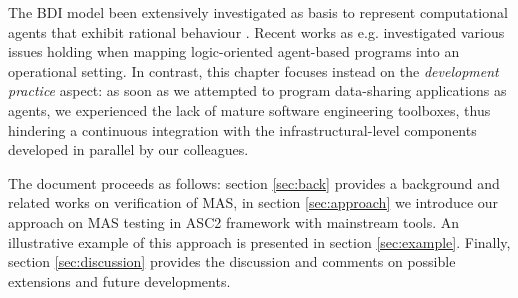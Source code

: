 The BDI model been extensively investigated as basis to represent computational agents that exhibit rational behaviour \cite{Herzig2017}.
Recent works as e.g. \cite{Kampik2020} investigated various issues holding when mapping logic-oriented agent-based programs into an operational setting. In contrast, this chapter focuses instead on the \textit{development practice} aspect: as soon as we attempted to program data-sharing applications as agents, we experienced the lack of  mature software engineering toolboxes, thus hindering a continuous integration with the infrastructural-level components developed in parallel by our colleagues.


The document proceeds as follows: section \ref{sec:back} provides a background and related works on verification of MAS, in section \ref{sec:approach} we introduce our approach on MAS testing in ASC2 framework with mainstream tools. An illustrative example of this approach is presented in section \ref{sec:example}. Finally, section \ref{sec:discussion} provides the discussion and comments on possible extensions and future developments.




